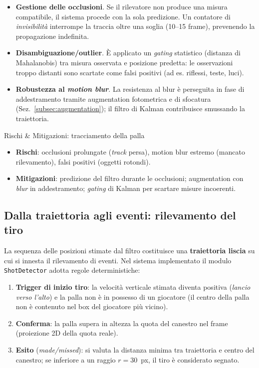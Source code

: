 \documentclass[12pt,a4paper,openright,twoside]{book}
\begin{document}
\begin{itemize}
  \item \textbf{Gestione delle occlusioni}. Se il rilevatore non produce 
  una misura compatibile, il sistema procede con la sola predizione. 
  Un contatore di \emph{invisibilità} interrompe la traccia oltre una 
  soglia (10--15 frame), prevenendo la propagazione indefinita.
  \item \textbf{Disambiguazione/outlier}. È applicato un \emph{gating} 
  statistico (distanza di Mahalanobis) tra misura osservata e posizione 
  predetta: le osservazioni troppo distanti sono scartate come falsi 
  positivi (ad es. riflessi, teste, luci).
  \item \textbf{Robustezza al \emph{motion blur}}. La resistenza al 
  blur è perseguita in fase di addestramento tramite augmentation 
  fotometrica e di sfocatura (Sez.~\ref{subsec:augmentation}); il 
  filtro di Kalman contribuisce smussando la traiettoria.
\end{itemize}

\begin{riskbox}{Rischi \& Mitigazioni: tracciamento della palla}
  \label{box:rischi-mitigazioni-palla}
  \begin{itemize}
    \item \textbf{Rischi}: occlusioni prolungate (\emph{track} persa), 
    motion blur estremo (mancato rilevamento), falsi positivi (oggetti 
    rotondi).
    \item \textbf{Mitigazioni}: predizione del filtro durante le occlusioni; 
    augmentation con \emph{blur} in addestramento; \emph{gating} di Kalman 
    per scartare misure incoerenti.
  \end{itemize}
\end{riskbox}

\subsection{Dalla traiettoria agli eventi: rilevamento del tiro}
\label{sec:stima-traiettoria-eventi}

La sequenza delle posizioni stimate dal filtro costituisce una 
\textbf{traiettoria liscia} su cui si innesta il rilevamento di eventi. 
Nel sistema implementato il modulo \texttt{ShotDetector} adotta 
regole deterministiche:

\begin{enumerate}
  \item \textbf{Trigger di inizio tiro}: la velocità verticale stimata 
  diventa positiva (\emph{lancio verso l'alto}) e la palla non è in 
  possesso di un giocatore (il centro della palla non è contenuto nel box 
  del giocatore più vicino).
  \item \textbf{Conferma}: la palla supera in altezza la quota del 
  canestro nel frame (proiezione 2D della quota reale).
  \item \textbf{Esito} (\emph{made/missed}): si valuta la distanza 
  minima tra traiettoria e centro del canestro; se inferiore a un raggio 
  $r=30$~px, il tiro è considerato segnato.
\end{enumerate}
\end{document}
